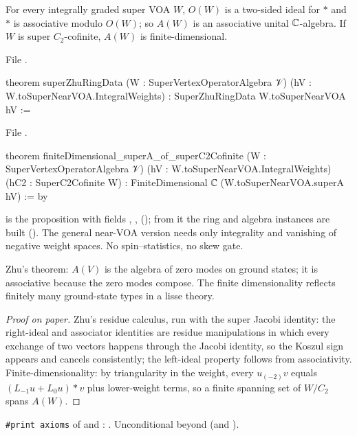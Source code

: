 \begin{theorem}\label{l17:thm:superzhuring}
For every integrally graded super VOA $W$, $O(W)$ is a two-sided ideal for $\ast$ and $\ast$ is
associative modulo $O(W)$; so $A(W)$ is an associative unital ${\mathbb{C}}$-algebra. If $W$ is super
$C_2$-cofinite, $A(W)$ is finite-dimensional.
\end{theorem}
\noindent File .
\begin{leancode}
theorem superZhuRingData (W : SuperVertexOperatorAlgebra 𝒱)
    (hV : W.toSuperNearVOA.IntegralWeights) :
    SuperZhuRingData W.toSuperNearVOA hV :=
\end{leancode}
\noindent File .
\begin{leancode}
theorem finiteDimensional_superA_of_superC2Cofinite (W : SuperVertexOperatorAlgebra 𝒱)
    (hV : W.toSuperNearVOA.IntegralWeights) (hC2 : SuperC2Cofinite W) :
    FiniteDimensional ℂ (W.toSuperNearVOA.superA hV) := by
\end{leancode}
\begin{dictionary}
 is the proposition with fields , ,
 (); from it the ring and algebra instances
are built (). The general near-VOA version  needs
only integrality and vanishing of negative weight spaces. No spin--statistics, no skew gate.
\end{dictionary}
\begin{physics}
Zhu's theorem: $A(V)$ is the algebra of zero modes on ground states; it is associative because the
zero modes compose. The finite dimensionality reflects finitely many ground-state types in a lisse
theory.
\end{physics}
\begin{proof}[Proof on paper]
Zhu's residue calculus, run with the super Jacobi identity: the right-ideal and associator identities
are residue manipulations in which every exchange of two vectors happens through the Jacobi identity,
so the Koszul sign appears and cancels consistently; the left-ideal property follows from
associativity. Finite-dimensionality: by triangularity in the weight, every $u_{(-2)}v$ equals
$(L_{-1}u+L_0u)\ast v$ plus lower-weight terms, so a finite spanning set of $W/C_2$ spans $A(W)$.
\end{proof}
\begin{status}
\texttt{\#print axioms} of  and
: . Unconditional beyond  (and ).
\end{status}

